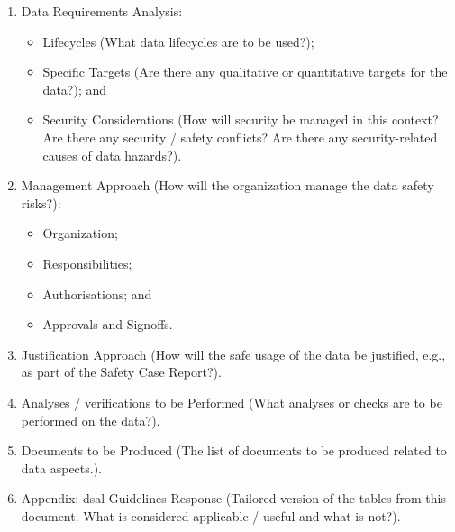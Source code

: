\begin{enumerate}
  \item Data Requirements Analysis:
  \begin{itemize}
    \item Lifecycles (What data lifecycles are to be used?);
    \item Specific Targets (Are there any qualitative or quantitative targets for the data?); and
    \item Security Considerations (How will security be managed in this context? Are there any security / safety conflicts? Are there any security-related causes of data \glspl{hazard}?).
  \end{itemize}
  \item Management Approach (How will the organization manage the data safety risks?):
  \begin{itemize}
    \item Organization;
    \item Responsibilities;
    \item Authorisations; and
    \item Approvals and Signoffs.
  \end{itemize}
  \item Justification Approach (How will the safe usage of the data be justified, e.g., as part of the Safety Case Report?). 
  \item Analyses / \glspl{verification} to be Performed (What analyses or checks are to be performed on the data?).
  \item Documents to be Produced (The list of documents to be produced related to data aspects.).
  \item Appendix: \gls{dsal} Guidelines Response (Tailored version of the tables from this document. What is considered applicable / useful and what is not?).
\end{enumerate}
